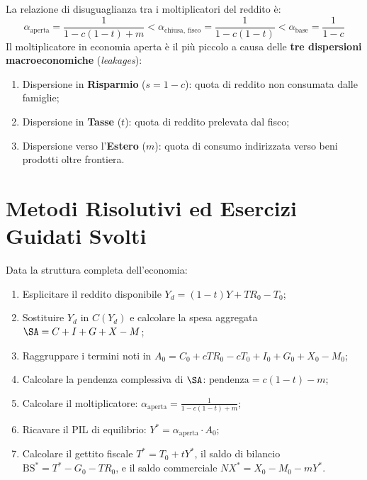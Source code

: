 \begin{osservazione}
La relazione di disuguaglianza tra i moltiplicatori del reddito è:
\begin{equation}
    \alpha_{\text{aperta}} = \frac{1}{1 - c(1 - t) + m} < \alpha_{\text{chiusa, fisco}} = \frac{1}{1 - c(1 - t)} < \alpha_{\text{base}} = \frac{1}{1 - c}
\end{equation}
Il moltiplicatore in economia aperta è il più piccolo a causa delle \textbf{tre dispersioni macroeconomiche} (\textit{leakages}):
\begin{enumerate}
    \item Dispersione in \textbf{Risparmio} ($s = 1 - c$): quota di reddito non consumata dalle famiglie;
    \item Dispersione in \textbf{Tasse} ($t$): quota di reddito prelevata dal fisco;
    \item Dispersione verso l'\textbf{Estero} ($m$): quota di consumo indirizzata verso beni prodotti oltre frontiera.
\end{enumerate}
\end{osservazione}

\section{Metodi Risolutivi ed Esercizi Guidati Svolti}

\begin{metodo}
Data la struttura completa dell'economia:
\begin{enumerate}
    \item Esplicitare il reddito disponibile $Y_d = (1-t)Y + TR_0 - T_0$;
    \item Sostituire $Y_d$ in $C(Y_d)$ e calcolare la spesa aggregata $\SA = C + I + G + X - M$;
    \item Raggruppare i termini noti in $A_0 = C_0 + c TR_0 - c T_0 + I_0 + G_0 + X_0 - M_0$;
    \item Calcolare la pendenza complessiva di $\SA$: $\text{pendenza} = c(1-t) - m$;
    \item Calcolare il moltiplicatore: $\alpha_{\text{aperta}} = \frac{1}{1 - c(1-t) + m}$;
    \item Ricavare il PIL di equilibrio: $Y^* = \alpha_{\text{aperta}} \cdot A_0$;
    \item Calcolare il gettito fiscale $T^* = T_0 + tY^*$, il saldo di bilancio $\mathrm{BS}^* = T^* - G_0 - TR_0$, e il saldo commerciale $NX^* = X_0 - M_0 - mY^*$.
\end{enumerate}
\end{metodo}

